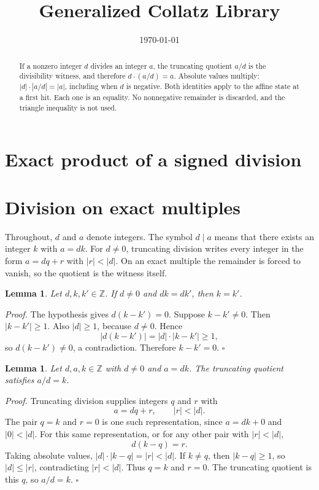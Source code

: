 \documentclass[11pt,letterpaper]{article}
\title{Generalized Collatz Library}
\author{}
\date{\today}
\newcommand{\Z}{\mathbb{Z}}
\newtheorem{lemma}[theorem]{Lemma}
\newenvironment{proof}{\noindent\textit{Proof.}}{\hfill\(\square\)}
\begin{document}
\maketitle
\section*{Exact product of a signed division}

\begin{abstract}
If a nonzero integer \(d\) divides an integer \(a\), the truncating quotient
\(a/d\) is the divisibility witness, and therefore \(d\cdot(a/d)=a\). Absolute
values multiply: \(|d|\cdot|a/d|=|a|\), including when \(d\) is negative. Both
identities apply to the affine state at a first hit. Each one is an equality.
No nonnegative remainder is discarded, and the triangle inequality is not used.
\end{abstract}

\section{Division on exact multiples}

Throughout, \(d\) and \(a\) denote integers. The symbol \(d\mid a\) means that
there exists an integer \(k\) with \(a=dk\). For \(d\neq 0\), truncating
division writes every integer in the form \(a=dq+r\) with \(|r|<|d|\). On an
exact multiple the remainder is forced to vanish, so the quotient is the
witness itself.

\begin{lemma}
\label{lem:cancel}
Let \(d,k,k'\in\Z\). If \(d\neq 0\) and \(dk=dk'\), then \(k=k'\).
\end{lemma}

\begin{proof}
The hypothesis gives \(d(k-k')=0\). Suppose \(k-k'\neq 0\). Then
\(|k-k'|\ge 1\). Also \(|d|\ge 1\), because \(d\neq 0\). Hence
\[
|d(k-k')|=|d|\cdot|k-k'|\ge 1,
\]
so \(d(k-k')\neq 0\), a contradiction. Therefore \(k-k'=0\).
\end{proof}

\begin{lemma}
\label{lem:quotient-witness}
Let \(d,a,k\in\Z\) with \(d\neq 0\) and \(a=dk\). The truncating quotient
satisfies \(a/d=k\).
\end{lemma}

\begin{proof}
Truncating division supplies integers \(q\) and \(r\) with
\[
a=dq+r,\qquad |r|<|d|.
\]
The pair \(q=k\) and \(r=0\) is one such representation, since
\(a=dk+0\) and \(|0|<|d|\). For this same representation, or for any other
pair with \(|r|<|d|\),
\[
d(k-q)=r.
\]
Taking absolute values, \(|d|\cdot|k-q|=|r|<|d|\). If \(k\neq q\), then
\(|k-q|\ge 1\), so \(|d|\le |r|\), contradicting \(|r|<|d|\). Thus \(q=k\) and
\(r=0\). The truncating quotient is this \(q\), so \(a/d=k\).
\end{proof}
\end{document}
